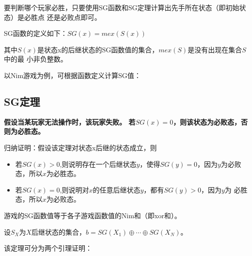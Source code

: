 要判断哪个玩家必胜，只要使用SG函数和SG定理计算出先手所在状态（即初始状态）是必胜点
还是必败点即可。

SG函数的定义如下：$SG(x)=mex(S(x))$

其中$S(x)$是状态x的后继状态的SG函数值的集合，$mex(S)$是没有出现在集合$S$中的最
小非负整数。

以Nim游戏为例，可根据函数定义计算SG值：



\subsection{SG定理}


\begin{theorem}
	\bfseries 假设当某玩家无法操作时，该玩家失败。\mdseries
	若$SG(x)=0$，则该状态为必败态，否则为必胜态。
\end{theorem}

归纳证明：假设该定理对状态x后继的状态成立，则

\begin{itemize}
	\item 若$SG(x)>0$,则说明存在一个后继状态$y$，使得$SG(y)=0$，因为$y$为必败
	      态，所以$x$为必胜态。
	\item 若$SG(x)=0$,则说明对$x$的任意后继状态$y$，都有$SG(y)>0$，因为$y$为
	      必胜态，所以$x$为必败态。
\end{itemize}

\begin{theorem}\label{SGB}
	游戏的SG函数值等于各子游戏函数值的Nim和（即xor和）。
\end{theorem}

设$S_X$为$X$后继状态的集合，$b=SG(X_1)\oplus \cdots \oplus SG(X_N)$。

该定理可分为两个引理证明：

